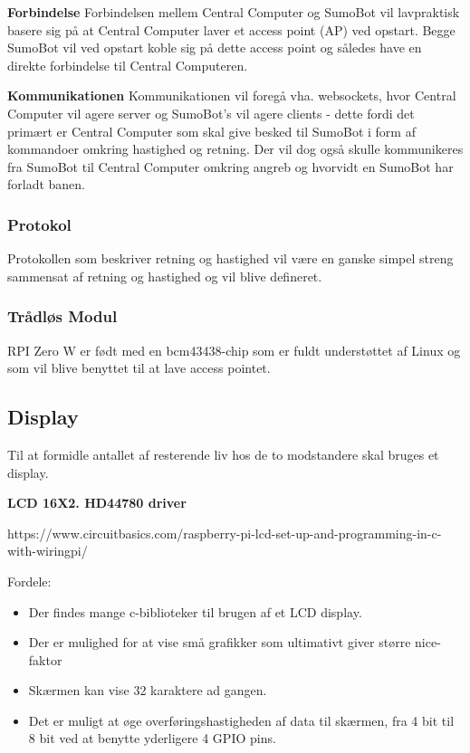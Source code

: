 \textbf{Forbindelse}\newline
Forbindelsen mellem Central Computer og SumoBot vil lavpraktisk basere sig på at Central Computer laver et access point (AP) ved opstart. Begge SumoBot vil ved opstart koble sig på dette access point og således have en direkte forbindelse til Central Computeren. 

\textbf{Kommunikationen}\newline
Kommunikationen vil foregå vha. websockets, hvor Central Computer vil agere server og SumoBot's vil agere clients - dette fordi det primært er Central Computer som skal give besked til SumoBot i form af kommandoer omkring hastighed og retning. Der vil dog også skulle kommunikeres fra SumoBot til Central Computer omkring angreb og hvorvidt en SumoBot har forladt banen. 

\subsubsection{Protokol}
Protokollen som beskriver retning og hastighed vil være en ganske simpel streng sammensat af retning og hastighed og vil blive defineret. 

\subsubsection{Trådløs Modul}
RPI Zero W er født med en bcm43438-chip som er fuldt understøttet af Linux og som vil blive benyttet til at lave access pointet. 

\subsection{Display}
Til at formidle antallet af resterende liv hos de to modstandere skal bruges et display. 

\textbf{LCD 16X2. HD44780 driver} \newline

https://www.circuitbasics.com/raspberry-pi-lcd-set-up-and-programming-in-c-with-wiringpi/


Fordele: 
\begin{itemize}
\item Der findes mange c-biblioteker til brugen af et LCD display. 
\item Der er mulighed for at vise små grafikker som ultimativt giver større nice-faktor
\item Skærmen kan vise 32 karaktere ad gangen.
\item Det er muligt at øge overføringshastigheden af data til skærmen, fra 4 bit til 8 bit ved at benytte yderligere 4 GPIO pins.
\end{itemize}

